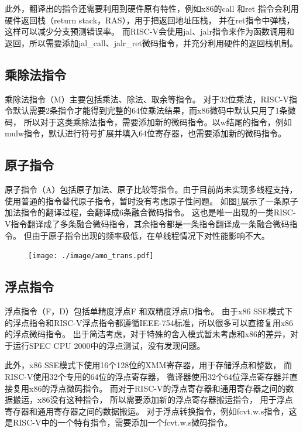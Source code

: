此外，翻译出的指令还需要利用到硬件原有特性，例如x86的call 和ret 指令会利用硬件返回栈（return stack，RAS），用于把返回地址压栈，
并在ret指令中弹栈，这样可以减少分支预测错误率。
而RISC-V会使用jal、jalr指令来作为函数调用和返回，所以需要添加jal\_call、jalr\_ret微码指令，并充分利用硬件的返回栈机制。


\subsection{乘除法指令}
乘除法指令（M）主要包括乘法、除法、取余等指令。
对于32位乘法，RISC-V指令默认需要2条指令才能得到完整的64位乘法结果，而x86微码中默认只用了1条微码，
所以对于这类乘除法指令，需要添加新的微码指令。以w结尾的指令，例如mulw指令，默认进行符号扩展并填入64位寄存器，也需要添加新的微码指令。

\subsection{原子指令}
原子指令（A）包括原子加法、原子比较等指令。由于目前尚未实现多线程支持，使用普通的指令替代原子指令，暂时没有考虑原子性问题。
如图\ref{img:amo_trans}展示了一条原子加法指令的翻译过程，会翻译成6条融合微码指令。
这也是唯一出现的一类RISC-V指令翻译成了多条融合微码指令，其余指令都是一条指令翻译成一条融合微码指令。
但由于原子指令出现的频率极低，在单线程情况下对性能影响不大。

\begin{figure}[!htbp]
  \centering
  \texttt{[image: ./image/amo\_trans.pdf]}
  \label{img:amo_trans}
\end{figure}

\subsection{浮点指令}
浮点指令（F，D）包括单精度浮点F 和双精度浮点D指令。
由于x86 SSE模式下的浮点指令和RISC-V浮点指令都遵循IEEE-754标准，所以很多可以直接复用x86的浮点微码指令。
出于简洁考虑，对于特殊的舍入模式暂未考虑和x86的差异，对于运行SPEC CPU 2000中的浮点测试，没有发现问题。

此外，x86 SSE模式下使用16个128位的XMM寄存器，用于存储浮点和整数，
而RISC-V使用32个专用的64位的浮点寄存器，
微译器使用32个64位浮点寄存器并直接复用x86的浮点微码指令。
而对于RISC-V的浮点寄存器和通用寄存器之间的数据搬运，x86没有这种指令，
所以需要添加新的浮点寄存器搬运指令，
用于浮点寄存器和通用寄存器之间的数据搬运。
对于浮点转换指令，例如fcvt.w.s指令，这是RISC-V中的一个特有指令，需要添加一个fcvt.w.s微码指令。

